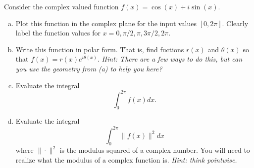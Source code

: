\documentclass[12pt]{article} %
\begin{document}
\newpage
\begin{problem}
	Consider the complex valued function $f(x) = \cos(x)+i\sin(x)$.  
	\begin{enumerate}[(a)]
		\item Plot this function in the complex plane for the input values $[0,2\pi]$. Clearly label the function values for $x=0,\pi/2,\pi,3\pi/2,2\pi$.
		\item Write this function in polar form. That is, find fuctions $r(x)$ and $\theta(x)$ so that $f(x)=r(x)e^{i\theta(x)}$. \emph{Hint: There are a few ways to do this, but can you use the geometry from (a) to help you here?}
		\item Evaluate the integral
		\[
			\int_0^{2\pi}f(x)dx.
		\]
		\item Evaluate the integral
		\[
			\int_0^{2\pi} \|f(x)\|^2dx
		\]
		where $\|\cdot\|^2$ is the modulus squared of a complex number. You will need to realize what the modulus of a complex function is. \emph{Hint: think pointwise.}
	\end{enumerate}
\end{problem}
\end{document}
